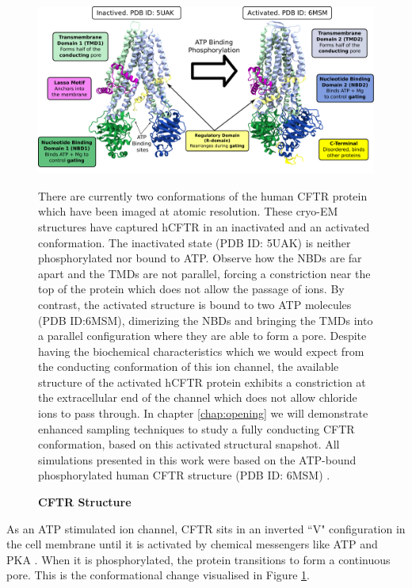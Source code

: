 \begin{figure}
	\begin{center}
	\includegraphics[width=\textwidth]{figures/CFTR_structure.pdf}
	\end{center}
	\label{CFTR_structure_domains}
	\captionsetup{singlelinecheck = false, justification=raggedright}
	\caption[CFTR Structure] {\textbf{CFTR Structure}}{There are currently two conformations of the human CFTR protein which have been imaged at atomic resolution. These cryo-EM structures have captured hCFTR in an inactivated and an activated conformation. The inactivated state (PDB ID: 5UAK) is neither phosphorylated nor bound to ATP. Observe how the NBDs are far apart and the TMDs are not parallel, forcing a constriction near the top of the protein which does not allow the passage of ions. By contrast, the activated structure is bound to two ATP molecules (PDB ID:6MSM), dimerizing the NBDs and bringing the TMDs into a parallel configuration where they are able to form a pore. Despite having the biochemical characteristics which we would expect from the conducting conformation of this ion channel, the available structure of the activated hCFTR protein exhibits a constriction at the extracellular end of the channel which does not allow chloride ions to pass through. In chapter \ref{chap:opening} we will demonstrate enhanced sampling techniques to study a fully conducting CFTR conformation, based on this activated structural snapshot. All simulations presented in this work were based on the ATP-bound phosphorylated human CFTR structure (PDB ID: 6MSM) \cite{zhang2018}.} 

\end{figure}

As an ATP stimulated ion channel, CFTR sits in an inverted ``V" configuration in the cell membrane until it is activated by chemical messengers like ATP and PKA \cite{zhang2018, gadsby2006, mihalyi2020}. When it is phosphorylated, the protein transitions to form a continuous pore. This is the conformational change visualised in Figure \ref{CFTR_structure_domains}.

